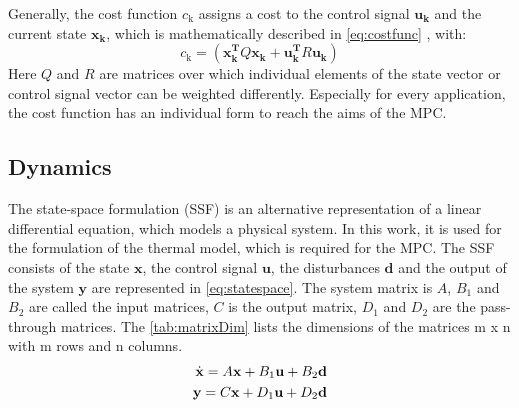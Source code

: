     Generally, the cost function $c_\text{k}$ assigns a cost to the control signal $\mathbf{u_k}$ and the current state $\mathbf{x_k}$, which is mathematically described in
    \autoref{eq:costfunc}
    , with:
    \begin{equation}
    \label{eq:c_k}
    c_\text{k} = (\mathbf{x_k^T}Q\mathbf{x_k}+\mathbf{u_k^T}R\mathbf{u_k})
    \end{equation}
    Here $Q$ and $R$ are matrices over which individual elements of the state vector or control signal vector can be weighted differently.  
    \cite{Kouvaritakis.2016}
    Especially for every application, the cost function has an individual form to reach the aims of the MPC.
    
\subsection{Dynamics}
\label{subsection:dynamics}
    
    The state-space formulation (SSF) is an alternative representation of a linear differential equation, which models a physical system. In this work, it is used for the formulation of the thermal model, which is required for the MPC. The SSF consists of the state $\textbf{x}$, the control signal $\textbf{u}$, the disturbances $\textbf{d}$ and the output of the system $\textbf{y}$ are represented in \autoref{eq:statespace}. The system matrix is $A$, $B_1$ and $B_2$ are called the input matrices, $C$ is the output matrix, $D_1$ and $D_2$ are the pass-through matrices. The \autoref{tab:matrixDim} lists the dimensions of the matrices m x n with m rows and n columns.   
    \begin{align}
    \label{eq:statespace}
    \dot{\textbf{x}}=A\textbf{x}+B_1\textbf{u}+B_2\textbf{d}\\
    \textbf{y}=C\textbf{x}+D_1\textbf{u}+D_2\textbf{d} \notag
    \end{align}
    
